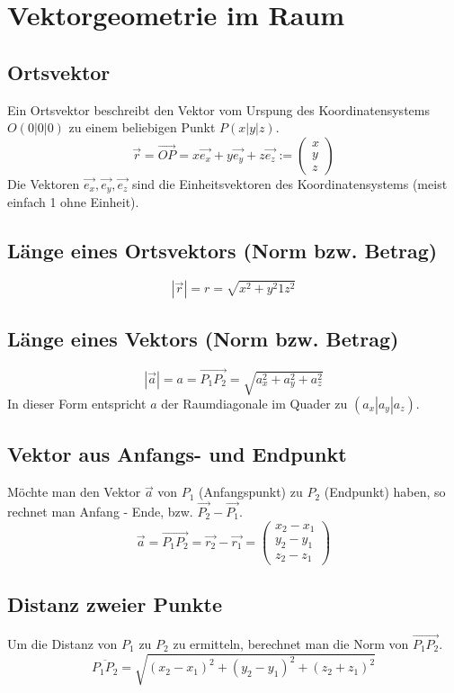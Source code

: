 \section{Vektorgeometrie im Raum}

\subsection{Ortsvektor}
Ein Ortsvektor beschreibt den Vektor vom Urspung des Koordinatensystems $O(0|0|0)$ zu einem beliebigen Punkt $P(x|y|z)$.
\[	\boxed{ \vec{r} = \overrightarrow{OP} = x\vec{e_x} + y\vec{e_y} + z\vec{e_z} :=
	\left( 
	  \begin{array}{ccc} 
	    x \\ y \\ z
	  \end{array}
	\right) }
\]
\noindent
Die Vektoren $\vec{e_x},\vec{e_y},\vec{e_z}$ sind die Einheitsvektoren des Koordinatensystems (meist einfach 1 ohne Einheit).
\subsection{Länge eines Ortsvektors (Norm bzw. Betrag)}
\[ \boxed{ |\vec{r}| = r = \sqrt{x^2 + y^2 1 z^2} } \]

\subsection{Länge eines Vektors (Norm bzw. Betrag)}
\[ \boxed{ |\vec{a}| = a = \overrightarrow{P_1P_2} = \sqrt{a_x^2 + a_y^2 + a_z^2} } \]
In dieser Form entspricht $a$ der Raumdiagonale im Quader zu $(a_x|a_y|a_z)$.

\subsection{Vektor aus Anfangs- und Endpunkt}
Möchte man den Vektor $\vec{a}$ von $P_1$ (Anfangspunkt) zu $P_2$ (Endpunkt) haben, so rechnet man Anfang - Ende, bzw. $\vec{P_2} - \vec{P_1}$.
\[  \boxed{
    \vec{a} = \overrightarrow{P_1P_2} = \vec{r_2} - \vec{r_1} =
    \left( 
	  \begin{array}{ccc} 
	    x_2 - x_1 \\ y_2 - y_1 \\ z_2 - z_1
	  \end{array}
	\right)
    }
\]

\subsection{Distanz zweier Punkte}
Um die Distanz von $P_1$ zu $P_2$ zu ermitteln, berechnet man die Norm von $\overrightarrow{P_1P_2}$.
\[ \boxed{
   \overline{P_1P_2} = \sqrt{ (x_2 - x_1)^2 + (y_2 - y_1)^2 + (z_2 + z_1)^2 }
   }
\]

